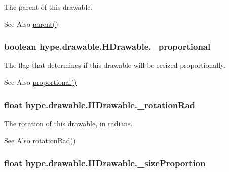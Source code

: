 The parent of this drawable. 

\begin{DoxySeeAlso}{See Also}
\hyperlink{classhype_1_1drawable_1_1_h_drawable_a8727cdaaf42b1a6fe73179a1c8422f74}{parent()} 
\end{DoxySeeAlso}
\hypertarget{classhype_1_1drawable_1_1_h_drawable_a7f9bb1ed841a8c8fe52e351ee3bf5844}{
\subsubsection[{\-\_\-proportional}]{\setlength{\rightskip}{0pt plus 5cm}boolean hype.\-drawable.\-H\-Drawable.\-\_\-proportional\hspace{0.3cm}{\ttfamily [protected]}}}\label{classhype_1_1drawable_1_1_h_drawable_a7f9bb1ed841a8c8fe52e351ee3bf5844}


The flag that determines if this drawable will be resized proportionally. 

\begin{DoxySeeAlso}{See Also}
\hyperlink{classhype_1_1drawable_1_1_h_drawable_a0b4162d5fbb7f045f84143beeafe4fb1}{proportional()} 
\end{DoxySeeAlso}
\hypertarget{classhype_1_1drawable_1_1_h_drawable_ae9b0ebe09024a9b3b41c8a94b97420af}{
\subsubsection[{\-\_\-rotation\-Rad}]{\setlength{\rightskip}{0pt plus 5cm}float hype.\-drawable.\-H\-Drawable.\-\_\-rotation\-Rad\hspace{0.3cm}{\ttfamily [protected]}}}\label{classhype_1_1drawable_1_1_h_drawable_ae9b0ebe09024a9b3b41c8a94b97420af}


The rotation of this drawable, in radians. 

\begin{DoxySeeAlso}{See Also}
rotation\-Rad() 
\end{DoxySeeAlso}
\hypertarget{classhype_1_1drawable_1_1_h_drawable_ac392c998fcc0709faa477e2ffa0d8b00}{
\subsubsection[{\-\_\-size\-Proportion}]{\setlength{\rightskip}{0pt plus 5cm}float hype.\-drawable.\-H\-Drawable.\-\_\-size\-Proportion\hspace{0.3cm}{\ttfamily [protected]}}}\label{classhype_1_1drawable_1_1_h_drawable_ac392c998fcc0709faa477e2ffa0d8b00}


